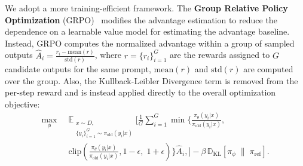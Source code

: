 We adopt a more training-efficient framework. The \textbf{Group Relative Policy Optimization} (GRPO)~\citep{grpo} modifies the advantage estimation to reduce the dependence on a learnable value model for estimating the advantage baseline. Instead, GRPO computes the normalized advantage within a group of sampled outputs \(\hat{A}_{i} = \frac{r_i - \mathrm{mean}(r)}{\mathrm{std}(r)}  \), 
where \(r=\{ r_i \}_{i=1}^G\) are the rewards assigned to \(G\) candidate outputs for the same prompt, \(\mathrm{mean}(r)\) and \(\mathrm{std}(r)\) are computed over the group. Also, the Kullback-Leibler Divergence term is removed from the per-step reward and is instead applied directly to the overall optimization objective:
\begin{align}
\max_{\phi} \; \;
& \mathbb{E}_{\substack{x \sim D, \\ \{y_i\}_{i=1}^G \sim \pi_{\mathrm{old}}(y_i|x)}} 
\Bigg[
   \frac{1}{G} \sum_{i=1}^G
   \min \Bigg\{
      \frac{\pi_{\theta}(y_i|x)}{\pi_{\mathrm{old}}(y_i|x)} ,  \;
      \nonumber \\[-0.5em]
& 
      \mathrm{clip}\!\left(
         \frac{\pi_{\theta}(y_i|x)}{\pi_{\mathrm{old}}(y_i|x)},
         1 - \epsilon, \;
         1 + \epsilon
      \right) 
   \Bigg\} \hat{A}_{i},
\Bigg] 
- \beta \, \mathbb{D}_{\mathrm{KL}}\!\left[ \pi_{\phi} \;\|\; \pi_{\mathrm{ref}} \right].
\end{align}

